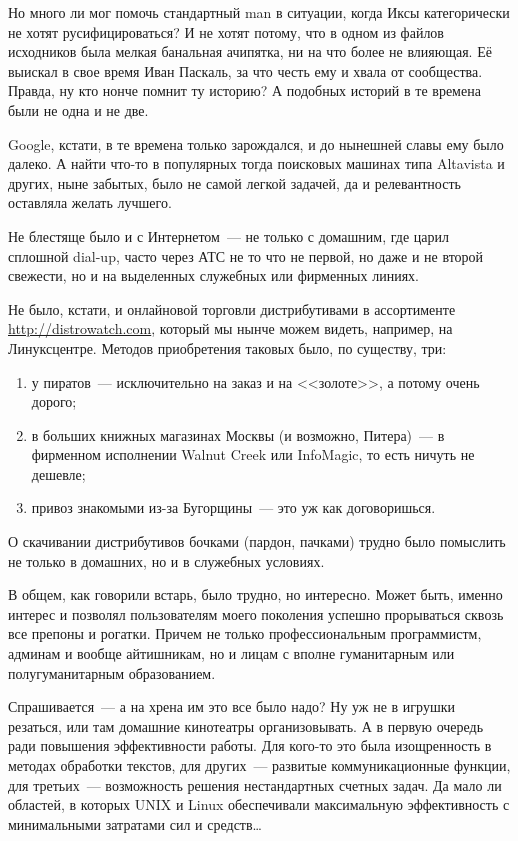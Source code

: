 Но много ли мог помочь стандартный man в ситуации, когда Иксы категорически не хотят русифицироваться? И не хотят потому, что в одном из файлов исходников была мелкая банальная ачипятка, ни на что более не влияющая. Её выискал в свое время Иван Паскаль, за что честь ему и хвала от сообщества. Правда, ну кто нонче помнит ту историю? А подобных историй в те времена были не одна и не две.

Google, кстати, в те времена только зарождался, и до нынешней славы ему было далеко. А найти что-то в популярных тогда поисковых машинах типа Altavista и других, ныне забытых, было не самой легкой задачей, да и релевантность оставляла желать лучшего.

Не блестяще было и с Интернетом~--- не только с домашним, где царил сплошной dial-up, часто через АТС не то что не первой, но даже и не второй свежести, но и на выделенных служебных или фирменных линиях.

Не было, кстати, и онлайновой торговли дистрибутивами в ассортименте \url{http://distrowatch.com}, который мы нынче можем видеть, например, на Линуксцентре. Методов приобретения таковых было, по существу, три:

\begin{enumerate}
	\item у пиратов~--- исключительно на заказ и на <<золоте>>, а потому очень дорого;
	\item в больших книжных магазинах Москвы (и возможно, Питера)~--- в фирменном исполнении Walnut Creek или InfoMagic, то есть ничуть не дешевле;
	\item привоз знакомыми из-за Бугорщины~--- это уж как договоришься.
\end{enumerate}

О скачивании дистрибутивов бочками (пардон, пачками) трудно было помыслить не только в домашних, но и в служебных условиях.

В общем, как говорили встарь, было трудно, но интересно. Может быть, именно интерес и позволял пользователям моего поколения успешно прорываться сквозь все препоны и рогатки. Причем не только профессиональным программистм, админам и вообще айтишникам, но и лицам с вполне гуманитарным или полугуманитарным образованием.

Спрашивается~--- а на хрена им это все было надо? Ну уж не в игрушки резаться, или там домашние кинотеатры организовывать. А в первую очередь ради повышения эффективности работы. Для кого-то это была изощренность в методах обработки текстов, для других~--- развитые коммуникационные функции, для третьих~--- возможность решения нестандартных счетных задач. Да мало ли областей, в которых UNIX и Linux обеспечивали максимальную эффективность с минимальными затратами сил и средств\dots

